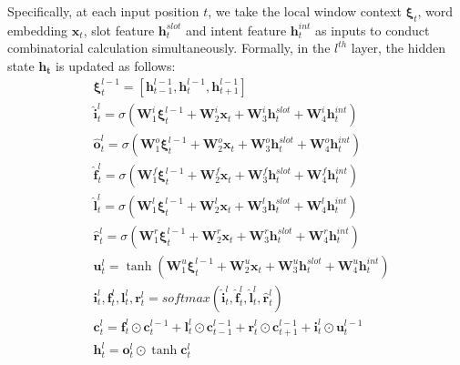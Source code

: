 \documentclass[11pt,a4paper]{article}
\begin{document}
Specifically, at each input position $t$, we take the local window context $\mathbf{\xi}_t$, word embedding $\mathbf{x}_t$, slot feature $\mathbf{h}_t^{slot}$  and intent feature $\mathbf{h}_t^{int}$ as inputs to conduct combinatorial calculation simultaneously.
Formally, in the $l^{th}$ layer, the hidden state $\mathbf{h_t}$ is updated as follows:
\begin{equation}
\begin{split}
  & \mathbf{\xi} _ { t } ^ { l-1 } = [ \mathbf{h} _ { t - 1 } ^ { l - 1 } , \mathbf{h} _ { t } ^ { l - 1 } , \mathbf{h} _ { t + 1 } ^ { l - 1 } ] 
 \\
 & \hat { \mathbf { i } } _ { t } ^ { l } =  \sigma ( \mathbf { W } _ { 1 }^{i} \mathbf { \xi } _ { t } ^ { l-1 } + \mathbf { W } _ { 2 }^{i} \mathbf { x } _ { t } + \mathbf { W } _ { 3 }^{i} \mathbf { h } ^ { slot } _ {t} +  \mathbf { W } _ { 4 }^{i} \mathbf { h } ^ { int } _ {t} ) 
 \\
 & \hat { \mathbf { o } } _ { t } ^ { l } =  \sigma ( \mathbf { W } _ { 1 }^{o} \mathbf { \xi } _ { t } ^ { l-1 } + \mathbf { W } _ { 2 }^{o} \mathbf { x } _ { t } + \mathbf { W } _ { 3 }^{o} \mathbf { h } ^ { slot } _ {t} +  \mathbf { W } _ { 4 }^{o} \mathbf { h } ^ { int } _ {t} ) 
 \\
 & \hat { \mathbf { f } } _ { t } ^ { l } =  \sigma ( \mathbf { W } _ { 1 }^{f} \mathbf { \xi } _ { t } ^ { l-1 } + \mathbf { W } _ { 2 }^{f} \mathbf { x } _ { t } + \mathbf { W } _ { 3 }^{f} \mathbf { h } ^ { slot } _ {t} +  \mathbf { W } _ { 4 }^{f} \mathbf { h } ^ { int } _ {t} ) 
  \\
  & \hat { \mathbf { l } } _ { t } ^ { l } =  \sigma ( \mathbf { W } _ { 1 }^{l} \mathbf { \xi } _ { t } ^ { l-1 } + \mathbf { W } _ { 2 }^{l} \mathbf { x } _ { t } + \mathbf { W } _ { 3 }^{l} \mathbf { h } ^ { slot } _ {t} +  \mathbf { W } _ { 4 }^{l} \mathbf { h } ^ { int } _ {t} ) 
  \\
  & \hat { \mathbf { r } } _ { t } ^ { l }  =  \sigma ( \mathbf { W } _ { 1 }^{r} \mathbf { \xi } _ { t } ^ { l-1 } + \mathbf { W } _ { 2 }^{r} \mathbf { x } _ { t } + \mathbf { W } _ { 3 }^{r} \mathbf { h } ^ { slot } _ {t} +  \mathbf { W } _ { 4 }^{r} \mathbf { h } ^ { int } _ {t} ) 
  \\
  & \mathbf { u } _ { t } ^ { l }  =  \tanh ( \mathbf { W } _ { 1 }^{u} \mathbf { \xi } _ { t } ^ { l-1 } + \mathbf { W } _ { 2 }^{u} \mathbf { x } _ { t } + \mathbf { W } _ { 3 }^{u} \mathbf { h } ^ { slot } _ {t} +  \mathbf { W } _ { 4 }^{u} \mathbf { h } ^ { int } _ {t} ) \\
  & \mathbf{i}_t^l, \mathbf{f}_t^l, \mathbf{l}_t^l, \mathbf{r}_t^l = softmax(\hat{\mathbf{i}}_t^l, \hat{\mathbf{f}}_t^l, \hat{\mathbf{l}}_t^l, \hat{\mathbf{r}}_t^l) \\
  & \mathbf{c}_t^l = \mathbf{f}_t^l \odot \mathbf{c}_{t}^{l-1} + \mathbf{l}_t^l \odot \mathbf{c}_{t-1}^{l-1} + \mathbf{r}_t^l \odot \mathbf{c}_{t+1}^{l-1} + \mathbf{i}_t^l \odot \mathbf{u}_{t}^{l-1} \\
  & \mathbf{h}_t^l = \mathbf{o}_t^l \odot \tanh{\mathbf{c}_t^l}
  \end{split}
\end{equation}
\end{document}
